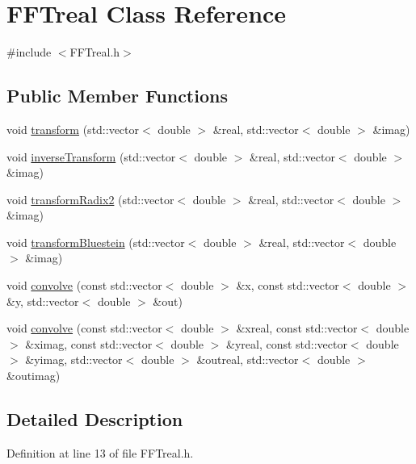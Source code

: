 \hypertarget{class_f_f_treal}{}\section{F\+F\+Treal Class Reference}
\label{class_f_f_treal}


{\ttfamily \#include $<$F\+F\+Treal.\+h$>$}

\subsection*{Public Member Functions}
\begin{DoxyCompactItemize}
\item 
void \mbox{\hyperlink{class_f_f_treal_a16caf75d31c313da4c6c1659497434c2}{transform}} (std\+::vector$<$ double $>$ \&real, std\+::vector$<$ double $>$ \&imag)
\item 
void \mbox{\hyperlink{class_f_f_treal_a1db8c322c9e02acf725f5599c8924d0a}{inverse\+Transform}} (std\+::vector$<$ double $>$ \&real, std\+::vector$<$ double $>$ \&imag)
\item 
void \mbox{\hyperlink{class_f_f_treal_afa3f0e3c25513ee26c9698b864330df9}{transform\+Radix2}} (std\+::vector$<$ double $>$ \&real, std\+::vector$<$ double $>$ \&imag)
\item 
void \mbox{\hyperlink{class_f_f_treal_a05861961bccf522231faf434b806e882}{transform\+Bluestein}} (std\+::vector$<$ double $>$ \&real, std\+::vector$<$ double $>$ \&imag)
\item 
void \mbox{\hyperlink{class_f_f_treal_a8c7ae7505d1c80b4471a30585801d64b}{convolve}} (const std\+::vector$<$ double $>$ \&x, const std\+::vector$<$ double $>$ \&y, std\+::vector$<$ double $>$ \&out)
\item 
void \mbox{\hyperlink{class_f_f_treal_a375983c9725f461611341061dbdcc92f}{convolve}} (const std\+::vector$<$ double $>$ \&xreal, const std\+::vector$<$ double $>$ \&ximag, const std\+::vector$<$ double $>$ \&yreal, const std\+::vector$<$ double $>$ \&yimag, std\+::vector$<$ double $>$ \&outreal, std\+::vector$<$ double $>$ \&outimag)
\end{DoxyCompactItemize}


\subsection{Detailed Description}


Definition at line 13 of file F\+F\+Treal.\+h.



